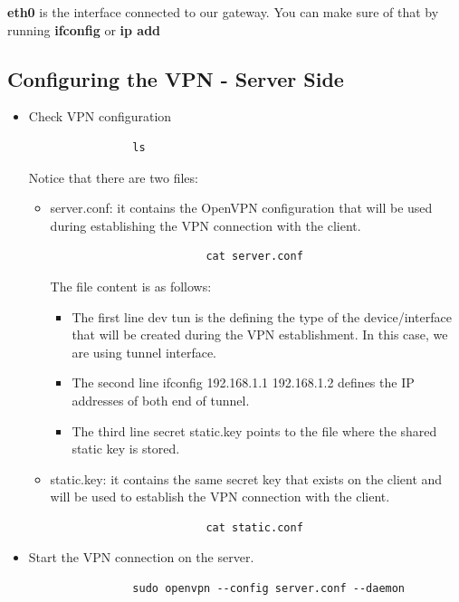 \textbf{eth0} is the interface connected to our gateway. You can make sure of that by running \textbf{ifconfig} or \textbf{ip add}
\newline
\newline

\subsection{Configuring the VPN - Server Side}
\begin{itemize}
	\item Check VPN configuration

		\begin{verbatim}
				ls
		\end{verbatim}

		Notice that there are two files:

		\begin{itemize}
			\item server.conf: it contains the OpenVPN configuration that will be used during establishing the VPN connection with the client.
				\begin{verbatim}
						cat server.conf
				\end{verbatim}

				The file content is as follows:
					\begin{itemize}
						\item The first line dev tun is the defining the type of the device/interface that will be created during the VPN establishment. In this case, we are using tunnel interface.
						\item The second line ifconfig 192.168.1.1 192.168.1.2 defines the IP addresses of both end of tunnel.
						\item The third line secret static.key points to the file where the shared static key is stored.
					\end{itemize}
			\item static.key: it contains the same secret key that exists on the client and will be used to establish the VPN connection with the client.
				\begin{verbatim}
						cat static.conf
				\end{verbatim}

		\end{itemize}

	\item Start the VPN connection on the server.
		\begin{verbatim}
				sudo openvpn --config server.conf --daemon
		\end{verbatim}
\end{itemize}

